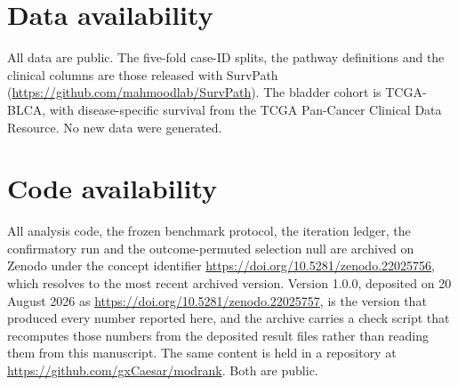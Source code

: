 \documentclass[unnumsec,webpdf,contemporary,large]{oup-authoring-template}
\begin{document}
\section{Data availability}
All data are public. The five-fold case-ID splits, the pathway definitions and the clinical columns
are those released with SurvPath (\url{https://github.com/mahmoodlab/SurvPath}). The bladder cohort
is TCGA-BLCA, with disease-specific survival from the TCGA Pan-Cancer Clinical Data Resource. No
new data were generated.

\section{Code availability}
All analysis code, the frozen benchmark protocol, the iteration ledger, the confirmatory run and the
outcome-permuted selection null are archived on Zenodo under the concept identifier
\url{https://doi.org/10.5281/zenodo.22025756}, which resolves to the most recent archived version.
Version 1.0.0, deposited on 20 August 2026 as \url{https://doi.org/10.5281/zenodo.22025757}, is the
version that produced every number reported here, and the archive carries a check script that
recomputes those numbers from the deposited result files rather than reading them from this
manuscript. The same content is held in a repository at \url{https://github.com/gxCaesar/modrank}.
Both are public.



\end{document}
